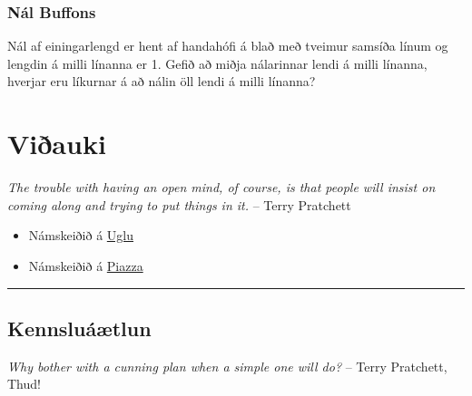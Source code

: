 \documentclass[letterpaper,10pt,icelandic]{sphinxmanual}
\begin{document}
\subsection{Nál Buffons}
\label{kafli10:nal-buffons}
Nál af einingarlengd er hent af handahófi á blað með tveimur samsíða línum
og lengdin á milli línanna er 1.
Gefið að miðja nálarinnar lendi á milli línanna, hverjar eru líkurnar
á að nálin öll lendi á milli línanna?


\chapter{Viðauki}
\label{vidauki:viauki}\label{vidauki::doc}
\emph{The trouble with having an open mind, of course, is that people will insist on coming along and trying to put things in it.}
-- Terry Pratchett
\begin{itemize}
\item {} 
Námskeiðið á \href{https://ugla.hi.is/kv/index2.php?sid=219\&namsknr=09104320160}{Uglu}

\item {} 
Námskeiðið á \href{https://www.piazza.com/hi.is/spring2016/st405g}{Piazza}

\end{itemize}
\newpage

\bigskip\hrule{}\bigskip



\section{Kennsluáætlun}
\label{vidauki:kennsluaaetlun}
\emph{Why bother with a cunning plan when a simple one will do?}
-- Terry Pratchett, Thud!
\end{document}
